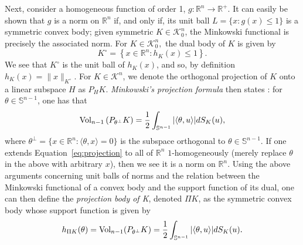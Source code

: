 \documentclass[11pt]{amsart}
\theoremstyle{definition}
\theoremstyle{remark}
\numberwithin{equation}{section}
\newcommand{\R}{\mathbb{R}}
\newcommand{\s}{\mathbb{S}}
\newcommand{\conbod}{\mathcal{K}^n}
\newcommand{\vol}{\text{\rm Vol}}
\begin{document}
Next, consider a homogeneous function of order 1, $g:\R^n\to\R^+$. It can easily be shown that $g$ is a norm on $\R^n$ if, and only if, its unit ball $L=\{x:g(x)\leq 1\}$ is a symmetric convex body; given symmetric $K\in\conbod_0$, the Minkowski functional is precisely the associated norm. For $K\in\conbod_0,$ the dual body of $K$ is given by $$K^\circ=\left\{x\in \R^n: h_K(x) \leq 1\right\}.$$ We see that $K^\circ$ is the unit ball of $h_K(x)$, and so, by definition $h_K(x)=\|x\|_{K^\circ}$. For $K \in \conbod$, we denote the orthogonal projection of $K$ onto a linear subspace $H$ as $P_H K$. \textit{Minkowski's projection formula} then states \cite{Sh1}: for $\theta\in\mathbb{S}^{n-1}$, one has that 
\begin{equation}
   \vol_{n-1}\left(P_{\theta^{\perp}}K\right) =\frac{1}{2}\int_{\s^{n-1}}|\langle \theta,u \rangle| dS_K(u),
\label{eq:projection}
	\end{equation}
where  $\theta^{\perp}=\{x\in\R^n:\langle \theta,x\rangle =0\}$ is the subspace orthogonal to $\theta \in \s^{n-1}$. If one extends Equation~\ref{eq:projection} to all of $\R^n$ $1$-homogeneously (merely replace $\theta$ in the above with arbitrary $x$), then we see it is a norm on $\R^n$. Using the above arguments concerning unit balls of norms and the relation between the Minkowski functional of a convex body and the support function of its dual, one can then define the \textit{projection body of K}, denoted $\Pi K$, as the symmetric convex body whose support function is given by 
\begin{equation}
    h_{\Pi K}(\theta)=\vol_{n-1}(P_{\theta^{\perp}}K) =\frac{1}{2}\int_{\s^{n-1}}|\langle \theta,u \rangle| dS_K(u).
    \label{proj_support}
\end{equation}
\end{document}

